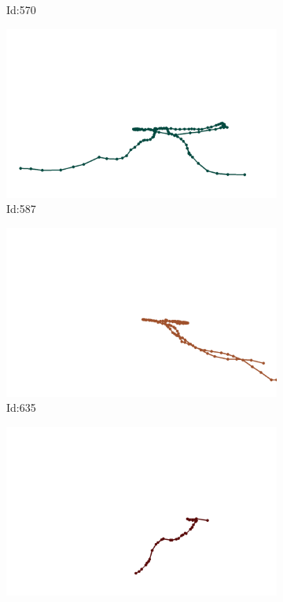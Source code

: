 \documentclass[12pt,twoside]{report}
\begin{document}
\begin{figure}
\begin{subfigure}[b]{0.20\textwidth}
\caption{Id:570}
\end{subfigure}
\begin{subfigure}[b]{0.20\textwidth}
\centering
\includegraphics[width=\textwidth]{../trajectories/587.png}
\caption{Id:587}
\end{subfigure}
\begin{subfigure}[b]{0.20\textwidth}
\centering
\includegraphics[width=\textwidth]{../trajectories/635.png}
\caption{Id:635}
\end{subfigure}
\begin{subfigure}[b]{0.20\textwidth}
\centering
\includegraphics[width=\textwidth]{../trajectories/792.png}

\end{subfigure}
\end{figure}
\end{document}
